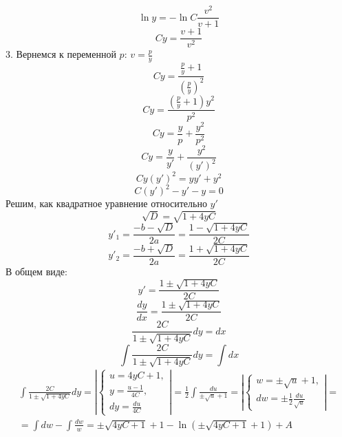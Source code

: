 \documentclass[a5paper, 10pt]{article}
\theoremstyle{definition}
\theoremstyle{plain}
\theoremstyle{remark}
\begin{document}
\begin{equation}
\ln y = -\ln C \frac{v^2}{v+1}
\end{equation}
\begin{equation}
Cy = \frac{v + 1}{v^2}
\end{equation}
3. Вернемся к переменной $p$: $v = \frac{p}{y}$
\begin{equation}
Cy = \frac{\frac{p}{y} + 1}{\left(\frac{p}{y} \right)^2}
\end{equation}
\begin{equation}
Cy = \frac{\left(\frac{p}{y} + 1 \right) y^2}{p^2}
\end{equation}
\begin{equation}
Cy = \frac{y}{p} + \frac{y^2}{p^2}
\end{equation}
\begin{equation}
Cy = \frac{y}{y'} + \frac{y^2}{(y')^2}
\end{equation}
\begin{equation}
Cy(y')^2 = yy' + y^2
\end{equation}
\begin{equation}
C(y')^2 - y' - y = 0
\end{equation}
Решим, как квадратное уравнение относительно $y'$
\begin{equation}
\sqrt{D} = \sqrt{1 + 4yC}
\end{equation}
\begin{equation}
y'_1 = \frac{-b - \sqrt{D}}{2a} = \frac{1 - \sqrt{1 + 4yC}}{2C}
\end{equation}
\begin{equation}
y'_2 = \frac{-b + \sqrt{D}}{2a} = \frac{1 + \sqrt{1 + 4yC}}{2C}
\end{equation}
В общем виде:
\begin{equation}
y'  = \frac{1 \pm \sqrt{1 + 4yC}}{2C}
\end{equation}
\begin{equation}
\frac{dy}{dx}  = \frac{1 \pm \sqrt{1 + 4yC}}{2C}
\end{equation}
\begin{equation}
  \frac{2C}{1 \pm \sqrt{1 + 4yC}} dy = dx
\end{equation}
\begin{equation}
 \int  \frac{2C}{1 \pm \sqrt{1 + 4yC}} dy = \int dx
\end{equation}
\begin{multline}
 \int  \frac{2C}{1 \pm \sqrt{1 + 4yC}} dy = \left|  \begin{cases} u = 4yC + 1, \\
y = \frac{u-1}{4C},\\
dy = \frac{du}{4C}  \end{cases} \right| = \frac{1}{2} \int \frac{du}{\pm \sqrt{u} + 1} =  \left|  \begin{cases} w = \pm \sqrt{u} + 1, \\
dw = \pm \frac{1}{2}\frac{du}{\sqrt{u}}  \end{cases} \right| =\\=
 \int dw - \int \frac{dw}{w} = \pm \sqrt{4yC + 1} + 1 - \ln \left( \pm \sqrt{4yC + 1} + 1 \right) + A
\end{multline}
\end{document}
